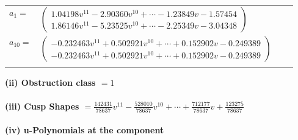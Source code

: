 \documentclass[1p]{elsarticle_modified}
\theoremstyle{definition}
\begin{document}
\begin{tabular}{m{7pt} m{180pt} m{7pt} m{180pt} }
\flushright $a_{1}=$&$\begin{pmatrix}1.04198 v^{11}-2.90360 v^{10}+\cdots-1.23849 v-1.57454\\1.86146 v^{11}-5.23525 v^{10}+\cdots-2.25349 v-3.04348\end{pmatrix}$ \\
\flushright $a_{10}=$&$\begin{pmatrix}-0.232463 v^{11}+0.502921 v^{10}+\cdots+0.152902 v-0.249389\\-0.232463 v^{11}+0.502921 v^{10}+\cdots+0.152902 v-0.249389\end{pmatrix}$\\&\end{tabular}
\flushleft \textbf{(ii) Obstruction class $= 1$}\\~\\
\flushleft \textbf{(iii) Cusp Shapes $= \frac{142431}{78637} v^{11}-\frac{528010}{78637} v^{10}+\cdots+\frac{712177}{78637} v+\frac{123275}{78637}$}\\~\\
\newpage\renewcommand{\arraystretch}{1}
\flushleft \textbf{(iv) u-Polynomials at the component}\newline \\
\end{document}
